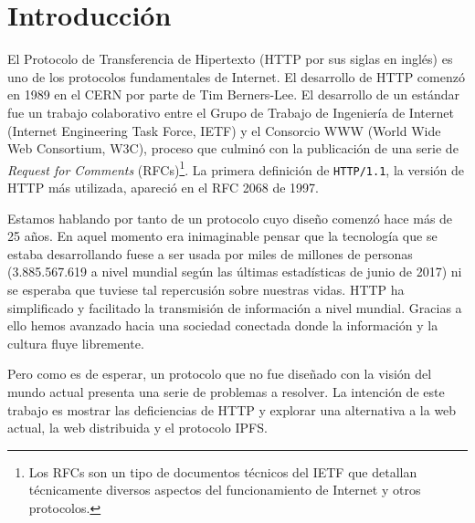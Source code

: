 \documentclass[12pt]{article} %
\begin{document}

\tableofcontents %

\newpage %


\section*{Introducción}

El Protocolo de Transferencia de Hipertexto (HTTP por sus siglas en inglés) es uno de los protocolos fundamentales de Internet. El desarrollo de HTTP comenzó en 1989 en el CERN por parte de Tim Berners-Lee. El desarrollo de un estándar fue un trabajo colaborativo entre el Grupo de Trabajo de Ingeniería de Internet (Internet Engineering Task Force, IETF) y el Consorcio WWW (World Wide Web Consortium, W3C), proceso que culminó con la publicación de una serie de \textit{Request for Comments} (RFCs)\footnote{Los RFCs son un tipo de documentos técnicos del IETF que detallan técnicamente diversos aspectos del funcionamiento de Internet y otros protocolos.}. La primera definición de \texttt{HTTP/1.1}, la versión de HTTP más utilizada, apareció en el RFC 2068 de 1997. 

Estamos hablando por tanto de un protocolo cuyo diseño comenzó hace más de 25 años. En aquel momento era inimaginable pensar que la tecnología que se estaba desarrollando fuese a ser usada por miles de millones de personas (3.885.567.619 a nivel mundial según las últimas estadísticas\cite{internet-world-stats} de junio de 2017) ni se esperaba que tuviese tal repercusión sobre nuestras vidas. HTTP ha simplificado y facilitado la transmisión de información a nivel mundial. Gracias a ello hemos avanzado hacia una sociedad conectada donde la información y la cultura fluye libremente.

Pero como es de esperar, un protocolo que no fue diseñado con la visión del mundo actual presenta una serie de problemas a resolver. La intención de este trabajo es mostrar las deficiencias de HTTP y explorar una alternativa a la web actual, la web distribuida y el protocolo IPFS.
\end{document}
